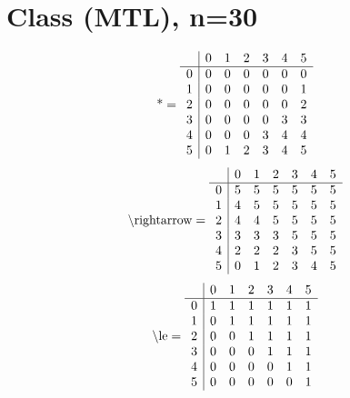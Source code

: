 \documentclass[11pt]{article}
\begin{document}
\section{Class (MTL), n=30}
\[\text{*} = 
\begin{array}{r | r r r r r r}
 & 0 & 1 & 2 & 3 & 4 & 5 \\ \hline
0 & 0 & 0 & 0 & 0 & 0 & 0 \\
1 & 0 & 0 & 0 & 0 & 0 & 1 \\
2 & 0 & 0 & 0 & 0 & 0 & 2 \\
3 & 0 & 0 & 0 & 0 & 3 & 3 \\
4 & 0 & 0 & 0 & 3 & 4 & 4 \\
5 & 0 & 1 & 2 & 3 & 4 & 5 \\
\end{array}
\]
\[\text{\textbackslash rightarrow} = 
\begin{array}{r | r r r r r r}
 & 0 & 1 & 2 & 3 & 4 & 5 \\ \hline
0 & 5 & 5 & 5 & 5 & 5 & 5 \\
1 & 4 & 5 & 5 & 5 & 5 & 5 \\
2 & 4 & 4 & 5 & 5 & 5 & 5 \\
3 & 3 & 3 & 3 & 5 & 5 & 5 \\
4 & 2 & 2 & 2 & 3 & 5 & 5 \\
5 & 0 & 1 & 2 & 3 & 4 & 5 \\
\end{array}
\]
\[\text{\textbackslash le} = 
\begin{array}{r | r r r r r r}
 & 0 & 1 & 2 & 3 & 4 & 5 \\ \hline
0 & 1 & 1 & 1 & 1 & 1 & 1 \\
1 & 0 & 1 & 1 & 1 & 1 & 1 \\
2 & 0 & 0 & 1 & 1 & 1 & 1 \\
3 & 0 & 0 & 0 & 1 & 1 & 1 \\
4 & 0 & 0 & 0 & 0 & 1 & 1 \\
5 & 0 & 0 & 0 & 0 & 0 & 1 \\
\end{array}
\]
\end{document}
